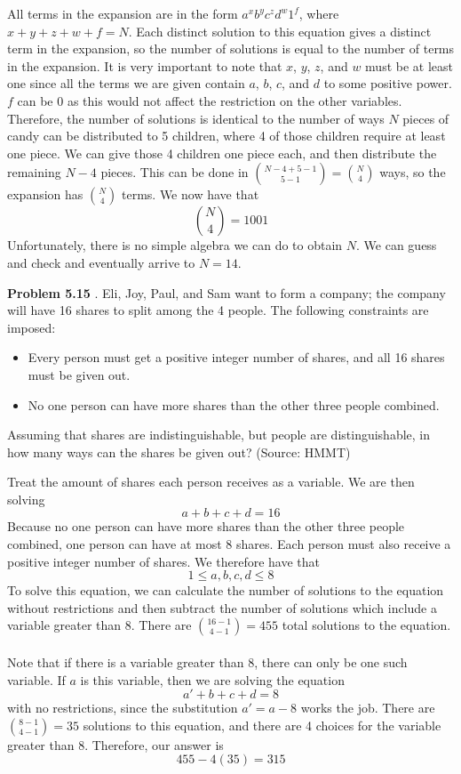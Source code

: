 \documentclass[11pt]{scrartcl}
\begin{document}
\noindent
All terms in the expansion are in the form $a^xb^yc^zd^w1^f$, where $x+y+z+w+f=N$. Each distinct solution to this equation gives a distinct term in the expansion, so the number of solutions is equal to the number of terms in the expansion. It is very important to note that $x$, $y$, $z$, and $w$ must be at least one since all the terms we are given contain $a$, $b$, $c$, and $d$ to some positive power. $f$ can be 0 as this would not affect the restriction on the other variables. Therefore, the number of solutions is identical to the number of ways $N$ pieces of candy can be distributed to 5 children, where 4 of those children require at least one piece. We can give those 4 children one piece each, and then distribute the remaining $N-4$ pieces. This can be done in ${{N-4+5-1} \choose {5-1}}={N \choose 4}$ ways, so the expansion has ${N \choose 4}$ terms. We now have that 
$${{N \choose 4}}=1001$$
Unfortunately, there is no simple algebra we can do to obtain $N$. We can guess and check and eventually arrive to $N=14$.
\begin{tcolorbox}
\textbf{Problem 5.15} . Eli, Joy, Paul, and Sam want to form a company; the company will have 16 shares to split among the
4 people. The following constraints are imposed:
\begin{itemize}
\item{Every person must get a positive integer number of shares, and all 16 shares must be given out.}

\item{No one person can have more shares than the other three people combined.}
\end{itemize}
Assuming that shares are indistinguishable, but people are distinguishable, in how many ways can the
shares be given out? (Source: HMMT)
\end{tcolorbox}
\noindent 
Treat the amount of shares each person receives as a variable. We are then solving $$a+b+c+d=16$$ Because no one person can have more shares than the other three people combined, one person can have at most 8 shares. Each person must also receive a positive integer number of shares. We therefore have that $$1 \leq a,b,c,d \leq 8$$
To solve this equation, we can calculate the number of solutions to the equation without restrictions and then subtract the number of solutions which include a variable greater than 8. There are ${{{16-1} \choose {4-1}}=455}$ total solutions to the equation. \\
\\
\noindent 
Note that if there is a variable greater than 8, there can only be one such variable. If $a$ is this variable, then we are solving the equation $$a'+b+c+d=8$$ with no restrictions, since the substitution $a'=a-8$ works the job. There are ${{{8-1} \choose {4-1}}={{35}}}$ solutions to this equation, and there are 4 choices for the variable greater than 8. Therefore, our answer is 
$$455-4(35)=315$$
\end{document}
